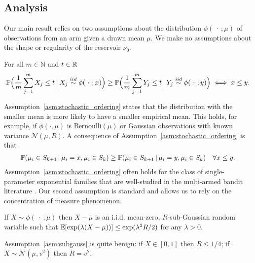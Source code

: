 \subsection{Analysis}
Our main result relies on two assumptions about the distribution $\phi(\ \cdot \ ; \mu)$ of observations from an arm given a drawn mean $\mu$.
We make no assumptions about the shape or regularity of the reservoir $\nu_0$.
\begin{assumption} \label{asm:stochastic_ordering}
For all $m \in \mathbb{N}$ and $t \in \R$
\begin{align*}
\P\Big(\frac{1}{m} \sum_{j=1}^m X_j \leq t \, \Big| \, X_j \overset{iid}{\sim} \phi( \ \cdot \ ; x) \Big) \geq \P\Big(\frac{1}{m} \sum_{j=1}^m Y_j \leq t \, \Big| \, Y_j \overset{iid}{\sim} \phi( \ \cdot \ ; y) \Big) \iff x \leq y.
\end{align*} 
\end{assumption}
Assumption~\ref{asm:stochastic_ordering} states that the distribution with the smaller mean is more likely to have a smaller empirical mean. 
This holds, for example, if $\phi(\cdot,\mu)$ is $\text{Bernoulli}(\mu)$ or Gaussian observations with known variance $\mathcal{N}(\mu,R)$.
A consequence of Assumption~\ref{asm:stochastic_ordering} is that
\begin{align*}
\P( \mu_i \in S_{k+1} \, | \, \mu_i = x, \mu_i \in S_{k} ) \geq \P( \mu_i \in S_{k+1} \, | \, \mu_i = y, \mu_i \in S_{k} ) \quad \forall x \leq y.
\end{align*} 
Assumption~\ref{asm:stochastic_ordering} often holds for the class of single-parameter exponential families that are well-studied in the multi-armed bandit literature \citep{audibert2010best}.
Our second assumption is standard and allows us to rely on the concentration of measure phenomenon.
\begin{assumption}\label{asm:subgauss}
If $X \sim \phi(\ \cdot \ ; \mu)$ then $X-\mu$ is an i.i.d. mean-zero, $R$-sub-Gaussian random variable such that $\E[\exp(\lambda (X-\mu))] \leq \exp(\lambda^2 R /2 )$ for any $\lambda >0$.
\end{assumption} 
Assumption~\ref{asm:subgauss} is quite benign: if $X \in [0,1]$ then $R \leq 1/4$; if $X \sim \mathcal{N}(\mu,v^2)$ then $R = v^2$.

